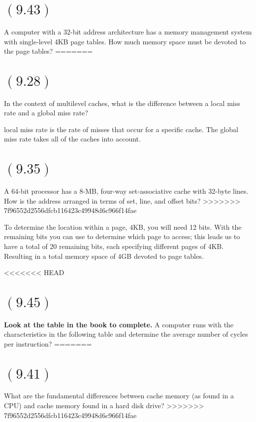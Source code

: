 \documentclass[letterpaper,12pt,titlepage]{article}
\begin{document}
\section*{$(9.43)$} A computer with a 32-bit address architecture has a memory management system with single-level 4KB page tables. How much memory space must be devoted to the page tables?
=======
\section*{$(9.28)$} In the context of multilevel caches, what is the difference between a local miss rate and a global miss rate?

\begin{mdframed}[style=MyFrame]
local miss rate is the rate of misses that occur for a specific cache. The global miss rate takes all of the caches into account.
\end{mdframed}

\section*{$(9.35)$} A 64-bit processor has a 8-MB, four-way set-associative cache with 32-byte lines. How is the address arranged in terms of set, line, and offset bits?
>>>>>>> 7f96552d2556dfcb116423c49948d6c966f14fae

\begin{mdframed}[style=MyFrame]
To determine the location within a page, 4KB, you will need 12 bits. With the remaining bits you can use to determine which page to access; this leads us to have a total of 20 remaining bits, each specifying different pages of 4KB. Resulting in a total memory space of 4GB devoted to page tables.
\end{mdframed}

<<<<<<< HEAD
\newpage
\section*{$(9.45)$} \textbf{Look at the table in the book to complete.} A computer runs with the characteristics in the following table and determine the average number of cycles per instruction?
=======
\section*{$(9.41)$} What are the fundamental differences between cache memory (as found in a CPU) and cache memory found in a hard disk drive?
>>>>>>> 7f96552d2556dfcb116423c49948d6c966f14fae
\end{document}
